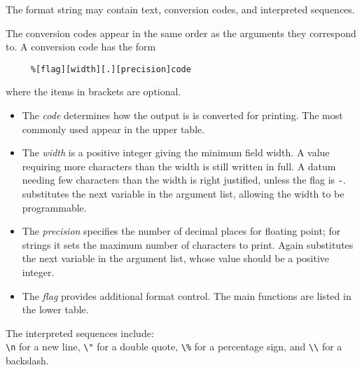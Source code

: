 \documentclass[twoside,11pt]{article}
\begin{document}
\begin{minipage}{73mm}
The format string may contain text, conversion codes, and interpreted
sequences.  

The conversion codes appear in the same order as the arguments
they correspond to.  A conversion code has the form

\small
\begin{verbatim}
     %[flag][width][.][precision]code
\end{verbatim}
\normalsize
\normalsize

where the items in brackets are optional.
\begin{itemize}
\item
The {\em code} determines how the output is is converted for printing.
The most commonly used appear in the upper table.
\item
The {\em width} is a positive integer giving the minimum field width.
A value requiring more characters than the width is still written in
full.  A datum needing few characters than the width is right
justified, unless the flag is {\tt -}.  {\tt *} substitutes the next
variable in the argument list, allowing the width to be programmable.
\item
The {\em precision} specifies the number of decimal places for
floating point; for strings it sets the maximum number of characters
to print.  Again {\tt *} substitutes the next variable in the argument
list, whose value should be a positive integer.
\item
The {\em flag} provides additional format control.  The main functions
are listed in the lower table.
\end{itemize}

The interpreted sequences include:\\
{\tt \verb+\+n} for a new line, {\tt \verb+\+"} for a double quote,
{\tt \verb+\%+} for a percentage sign, and {\tt \verb+\\+} for a backslash.

\end{minipage}
\ \hfill \
\end{document}

